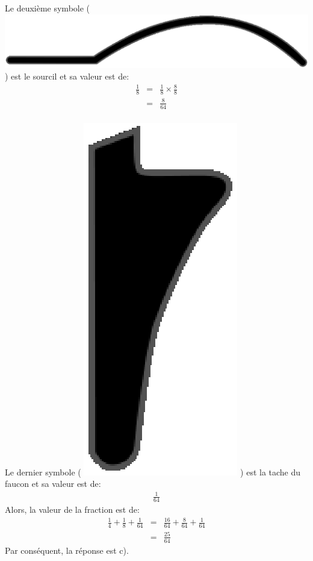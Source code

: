 \documentclass[letterpaper, 12pt]{article}
\begin{document}
Le deuxi\`eme symbole \Big( \includegraphics[scale=0.1]{sourcil.eps} \Big) est le sourcil et sa valeur est de:
\begin{eqnarray*}
\frac{1}{8} &=& \frac{1}{8} \times \frac{8}{8}\\
&=& \frac{8}{64}\\
\end{eqnarray*}

Le dernier symbole \Big( \includegraphics[scale=0.1]{faucon.eps} \Big) est la tache du faucon et sa valeur est de:
\begin{eqnarray*}
\frac{1}{64}
\end{eqnarray*}
Alors, la valeur de la fraction est de:
\begin{eqnarray*}
\frac{1}{4} + \frac{1}{8} + \frac{1}{64} &=& \frac{16}{64} + \frac{8}{64} + \frac{1}{64}\\
&=& \frac{25}{64}
\end{eqnarray*}
Par cons\'equent, la r\'eponse est c).\\
\end{document}
